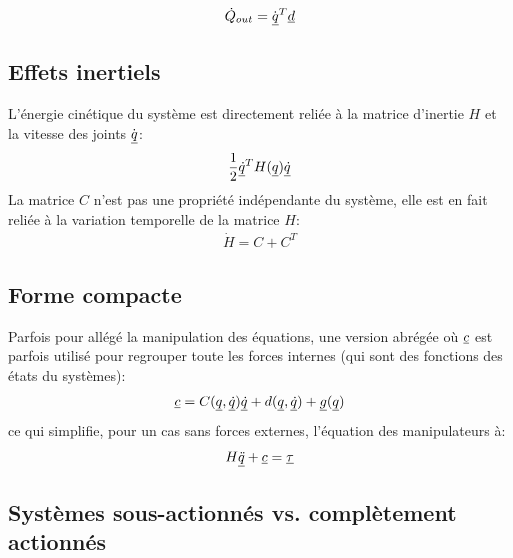 \begin{align}
\dot{Q}_{out} = \dot{\underline{q}}^T \underline{d}
\end{align}


\subsection{Effets inertiels}
%
L'énergie cinétique du système est directement reliée à la matrice d'inertie $H$ et la vitesse des joints $\dot{\underline{q}}$:
%
\begin{align}
\frac{1}{2} \underline{\dot{q}}^T H(\underline{q}) \underline{\dot{q}} 
\label{eq:kinetic}
\end{align}
%
La matrice $C$ n'est pas une propriété indépendante du système, elle est en fait reliée à la variation temporelle de la matrice $H$:
%
\begin{align}
\dot{H} = C + C^T
\label{eq:cener}
\end{align}

%

\subsection{Forme compacte}

Parfois pour allégé la manipulation des équations, une version abrégée où $\underline{c}$ est parfois utilisé pour regrouper toute les forces internes (qui sont des fonctions des états du systèmes):
\begin{align}
\underline{c} = C(\underline{q},\underline{\dot{q}}) \underline{\dot{q}} + d(\underline{q}, \underline{\dot{q}}) + \underline{g}(\underline{q})
\end{align}
ce qui simplifie, pour un cas sans forces externes, l'équation des manipulateurs à:
\begin{align}
H \underline{\ddot{q}} + \underline{c} = \underline{\tau} 
\label{eq:manipulator_short}
\end{align}


\newpage
\subsection{Systèmes sous-actionnés vs. complètement actionnés}
\label{sec:underactuated}




